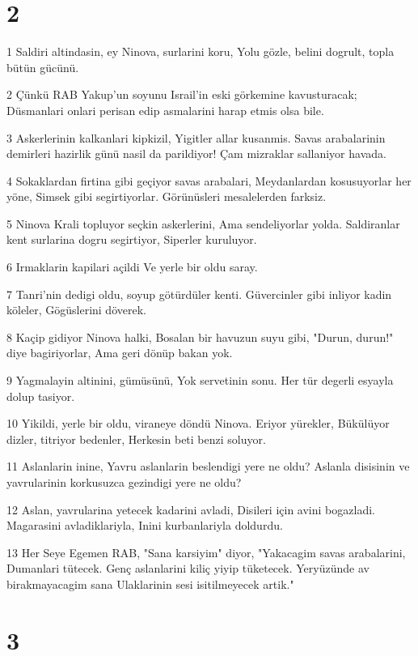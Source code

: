 \chapter{2}

\par 1 Saldiri altindasin, ey Ninova, surlarini koru, Yolu gözle, belini dogrult, topla bütün gücünü.
\par 2 Çünkü RAB Yakup'un soyunu Israil'in eski görkemine kavusturacak; Düsmanlari onlari perisan edip asmalarini harap etmis olsa bile.
\par 3 Askerlerinin kalkanlari kipkizil, Yigitler allar kusanmis. Savas arabalarinin demirleri hazirlik günü nasil da parildiyor! Çam mizraklar sallaniyor havada.
\par 4 Sokaklardan firtina gibi geçiyor savas arabalari, Meydanlardan kosusuyorlar her yöne, Simsek gibi segirtiyorlar. Görünüsleri mesalelerden farksiz.
\par 5 Ninova Krali topluyor seçkin askerlerini, Ama sendeliyorlar yolda. Saldiranlar kent surlarina dogru segirtiyor, Siperler kuruluyor.
\par 6 Irmaklarin kapilari açildi Ve yerle bir oldu saray.
\par 7 Tanri'nin dedigi oldu, soyup götürdüler kenti. Güvercinler gibi inliyor kadin köleler, Gögüslerini döverek.
\par 8 Kaçip gidiyor Ninova halki, Bosalan bir havuzun suyu gibi, "Durun, durun!" diye bagiriyorlar, Ama geri dönüp bakan yok.
\par 9 Yagmalayin altinini, gümüsünü, Yok servetinin sonu. Her tür degerli esyayla dolup tasiyor.
\par 10 Yikildi, yerle bir oldu, viraneye döndü Ninova. Eriyor yürekler, Bükülüyor dizler, titriyor bedenler, Herkesin beti benzi soluyor.
\par 11 Aslanlarin inine, Yavru aslanlarin beslendigi yere ne oldu? Aslanla disisinin ve yavrularinin korkusuzca gezindigi yere ne oldu?
\par 12 Aslan, yavrularina yetecek kadarini avladi, Disileri için avini bogazladi. Magarasini avladiklariyla, Inini kurbanlariyla doldurdu.
\par 13 Her Seye Egemen RAB, "Sana karsiyim" diyor, "Yakacagim savas arabalarini, Dumanlari tütecek. Genç aslanlarini kiliç yiyip tüketecek. Yeryüzünde av birakmayacagim sana Ulaklarinin sesi isitilmeyecek artik."

\chapter{3}

